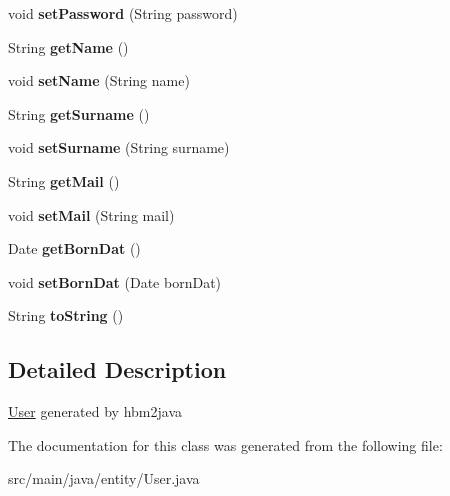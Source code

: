 \begin{DoxyCompactItemize}
\mbox{\label{classentity_1_1_user_a91eda90caa1220f6b2c0ec4aebbf6810}} 
void {\bfseries set\+Password} (String password)
\item 
\mbox{\label{classentity_1_1_user_aadec9c3bcce34926a4e3dfe092499934}} 
String {\bfseries get\+Name} ()
\item 
\mbox{\label{classentity_1_1_user_afd002543b54320b13cb004b909083ce4}} 
void {\bfseries set\+Name} (String name)
\item 
\mbox{\label{classentity_1_1_user_abc6c40b85eae27cc9ce6ff127767b47d}} 
String {\bfseries get\+Surname} ()
\item 
\mbox{\label{classentity_1_1_user_ad4d2d21374dd1352fe8d4d4349dbec0f}} 
void {\bfseries set\+Surname} (String surname)
\item 
\mbox{\label{classentity_1_1_user_ab5992e6dcc7b2cd7cf6a03b13b5ffa18}} 
String {\bfseries get\+Mail} ()
\item 
\mbox{\label{classentity_1_1_user_a0b95b72010c13f08b795c04165ab4d5c}} 
void {\bfseries set\+Mail} (String mail)
\item 
\mbox{\label{classentity_1_1_user_a6252395eaeb3df00686043ccabe886f4}} 
Date {\bfseries get\+Born\+Dat} ()
\item 
\mbox{\label{classentity_1_1_user_af06d5955e7b981aba4858413817e422e}} 
void {\bfseries set\+Born\+Dat} (Date born\+Dat)
\item 
\mbox{\label{classentity_1_1_user_a415c9d1d1003fb50953170650a8b369f}} 
String {\bfseries to\+String} ()
\end{DoxyCompactItemize}


\subsection{Detailed Description}
\mbox{\hyperlink{classentity_1_1_user}{User}} generated by hbm2java 

The documentation for this class was generated from the following file\+:\begin{DoxyCompactItemize}
\item 
src/main/java/entity/User.\+java\end{DoxyCompactItemize}
